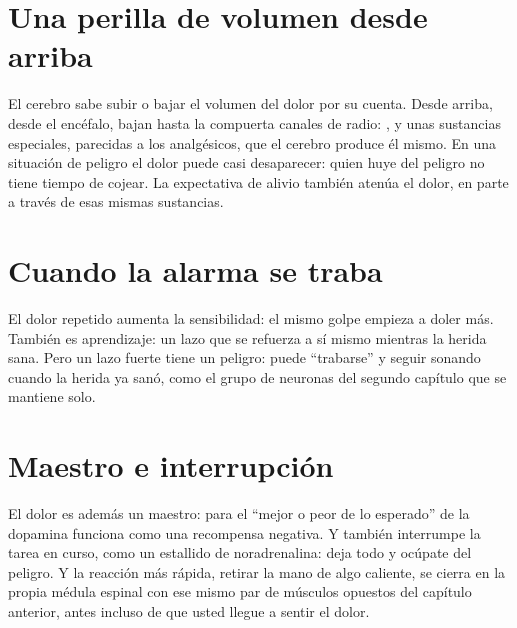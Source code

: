\section*{Una perilla de volumen desde arriba}

El cerebro sabe subir o bajar el volumen del dolor por su cuenta. Desde arriba, desde el encéfalo, bajan hasta la compuerta canales de radio: ,  y unas sustancias especiales, parecidas a los analgésicos, que el cerebro produce él mismo. En una situación de peligro el dolor puede casi desaparecer: quien huye del peligro no tiene tiempo de cojear. La expectativa de alivio también atenúa el dolor, en parte a través de esas mismas sustancias.

\section*{Cuando la alarma se traba}

El dolor repetido aumenta la sensibilidad: el mismo golpe empieza a doler más. También es aprendizaje: un lazo que se refuerza a sí mismo mientras la herida sana. Pero un lazo fuerte tiene un peligro: puede “trabarse” y seguir sonando cuando la herida ya sanó, como el grupo de neuronas del segundo capítulo que se mantiene solo.

\section*{Maestro e interrupción}

El dolor es además un maestro: para el “mejor o peor de lo esperado” de la dopamina funciona como una recompensa negativa. Y también interrumpe la tarea en curso, como un estallido de noradrenalina: deja todo y ocúpate del peligro. Y la reacción más rápida, retirar la mano de algo caliente, se cierra en la propia médula espinal con ese mismo par de músculos opuestos del capítulo anterior, antes incluso de que usted llegue a sentir el dolor.


